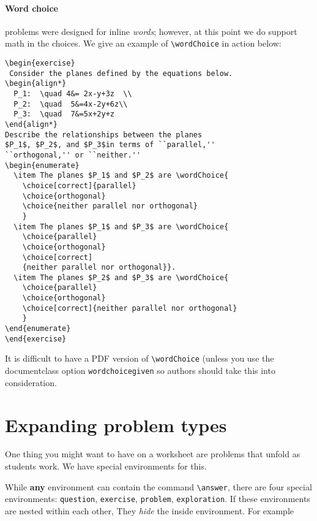 \documentclass{ximera}
\begin{document}
\paragraph{Word choice}
problems were designed for inline \textit{words}; however, at this
point we
do support math in the choices. We give an example of \verb!\wordChoice! in
action below:
\begin{verbatim}
\begin{exercise}
 Consider the planes defined by the equations below.
\begin{align*}
  P_1:  \quad 4&= 2x-y+3z  \\
  P_2:  \quad  5&=4x-2y+6z\\ 
  P_3:  \quad  7&=5x+2y+z
\end{align*}
Describe the relationships between the planes 
$P_1$, $P_2$, and $P_3$in terms of ``parallel,'' 
``orthogonal,'' or ``neither.''
\begin{enumerate}
  \item The planes $P_1$ and $P_2$ are \wordChoice{
    \choice[correct]{parallel}
    \choice{orthogonal}
    \choice{neither parallel nor orthogonal}
    }
  \item The planes $P_1$ and $P_3$ are \wordChoice{
    \choice{parallel}
    \choice{orthogonal}
    \choice[correct]
    {neither parallel nor orthogonal}}.
  \item The planes $P_2$ and $P_3$ are \wordChoice{
    \choice{parallel}
    \choice{orthogonal}
    \choice[correct]{neither parallel nor orthogonal}
    }
\end{enumerate}
\end{exercise}
\end{verbatim}
It is difficult to have a PDF version of \verb!\wordChoice! (unless you use the
documentclass option \texttt{wordchoicegiven} so authors should
take this into consideration.

\section{Expanding problem types}

One thing you might want to have on a worksheet are problems that unfold as
students work. We have special environments for this.

While \textbf{any} environment can contain the command \verb|\answer|,
there are four special environments: \verb|question|, \verb|exercise|,
\verb|problem|, \verb|exploration|. If these environments are nested within
each other, They \textit{hide} the inside environment. For example
\end{document}

